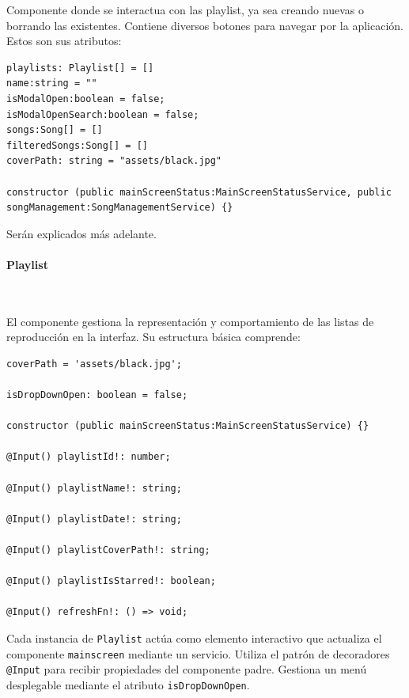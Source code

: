 \documentclass[11pt, a4paper]{article}
\begin{document}
            Componente donde se interactua con las playlist, ya sea creando nuevas o borrando las existentes. Contiene diversos botones para navegar por la aplicación. \\

            Estos son sus atributos:

            \begin{lstlisting}[caption={Atributos Y Constructora Sidebar}]
playlists: Playlist[] = []
name:string = ""
isModalOpen:boolean = false;
isModalOpenSearch:boolean = false;
songs:Song[] = []
filteredSongs:Song[] = []
coverPath: string = "assets/black.jpg"

constructor (public mainScreenStatus:MainScreenStatusService, public songManagement:SongManagementService) {}
            \end{lstlisting}

            Serán explicados más adelante.

                \paragraph{Playlist}
                ‎ 

                El componente gestiona la representación y comportamiento de las listas de reproducción en la interfaz. Su estructura básica comprende:

                \begin{lstlisting}[caption={Atributos y Constructora Playlist}]
coverPath = 'assets/black.jpg';

isDropDownOpen: boolean = false;

constructor (public mainScreenStatus:MainScreenStatusService) {}

@Input() playlistId!: number;

@Input() playlistName!: string;

@Input() playlistDate!: string;

@Input() playlistCoverPath!: string;

@Input() playlistIsStarred!: boolean;

@Input() refreshFn!: () => void;
                \end{lstlisting}

                Cada instancia de \texttt{Playlist} actúa como elemento interactivo que actualiza el componente \texttt{mainscreen} mediante un servicio. Utiliza el patrón de decoradores \texttt{@Input} para recibir propiedades del componente padre. Gestiona un menú desplegable mediante el atributo \texttt{isDropDownOpen}.
                
\end{document}
